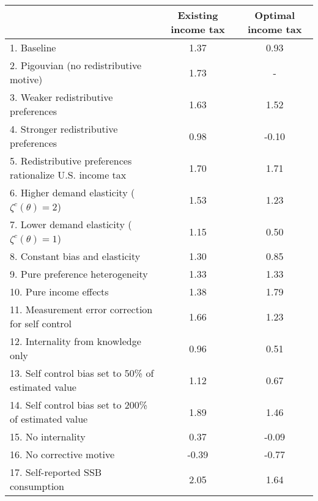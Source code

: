 \begin{tabular}{lcc}
\hline
\hline
 & Existing income tax & Optimal income tax \\
\hline
1. Baseline & 1.37 & 0.93 \\
2. Pigouvian (no redistributive motive) & 1.73 & - \\
3. Weaker redistributive preferences & 1.63 & 1.52 \\
4. Stronger redistributive preferences & 0.98 & -0.10 \\
5. Redistributive preferences rationalize U.S. income tax & 1.70 & 1.71 \\
6. Higher demand elasticity ($\zeta^c(\theta) = 2$) & 1.53 & 1.23 \\
7. Lower demand elasticity ($\zeta^c(\theta) = 1$) & 1.15 & 0.50 \\
8. Constant bias and elasticity & 1.30 & 0.85 \\
9. Pure preference heterogeneity & 1.33 & 1.33 \\
10. Pure income effects & 1.38 & 1.79 \\
11. Measurement error correction for self control & 1.66 & 1.23 \\
12. Internality from knowledge only & 0.96 & 0.51 \\
13. Self control bias set to 50\% of estimated value & 1.12 & 0.67 \\
14. Self control bias set to 200\% of estimated value & 1.89 & 1.46 \\
15. No internality & 0.37 & -0.09 \\
16. No corrective motive & -0.39 & -0.77 \\
17. Self-reported SSB consumption & 2.05 & 1.64 \\
\hline
\hline
\end{tabular}
